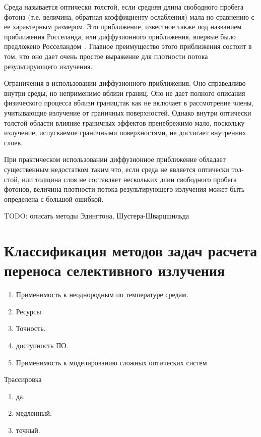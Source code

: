 Среда называется оптически толстой, если средняя длина свободного пробега фотона (т.е. величина, обратная коэффициенту ослабления) мала но сравнению с ее характерным размером. Это приближение, известное также под названием приближения Росселанда, или диффузионного приближения, впервые было предложено Росселандом~\cite{rossel}. Главное преимущество этого приближения состоит в том, что оно дает очень простое выражение для плотности потока результирующего излучения.

Ограничения в использовании диффузионного приближения. Оно справедливо внутри среды, но неприменимо вблизи границ. Оно не дает полного описания физического процесса вблизи границ,так как не включает в рассмотрение члены, учитывающие излучение от граничных поверхностей. Однако внутри оптически толстой области влияние граничных эффектов пренебрежимо мало, поскольку излучение, испускаемое граничными поверхностями, не достигает внутренних слоев.

При практическом использовании диффузионное приближение обладает существенным недостатком таким что, если среда не является оптически тол-
стой, или толщина слоя не составляет нескольких длин свободного пробега фотонов, величина плотности потока результирующего излучения может быть определена с большой ошибкой.


TODO: описать методы
 Эдингтона, Шустера-Шварцшильда

\section{Классификация методов задач расчета переноса 
селективного излучения}

\begin{enumerate}
	\item Применимость к неоднородным по температуре средам. 
	\item Ресурсы.
	\item Точность. 
        \item доступность ПО.
        \item Применимость к моделированию сложных оптических систем
        
\end{enumerate}

Трассировка

\begin{enumerate}
	\item да. 
	\item медленный.
	\item точный. 
\end{enumerate}

